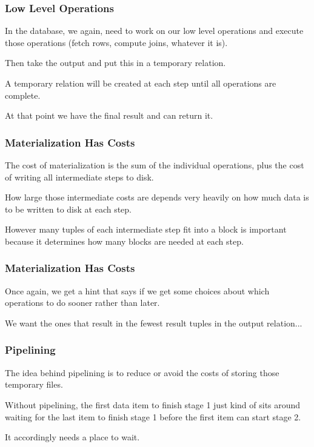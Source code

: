 \begin{frame}
\frametitle{Low Level Operations}
In the database, we again, need to work on our low level operations and execute those operations (fetch rows, compute joins, whatever it is).

Then take the output and put this in a temporary relation. 

A temporary relation will be created at each step until all operations are complete. 

At that point we have the final result and can return it. 


\end{frame}

\begin{frame}
\frametitle{Materialization Has Costs}
The cost of materialization is the sum of the individual operations, plus the cost of writing all intermediate steps to disk. 

How large those intermediate costs are depends very heavily on how much data is to be written to disk at each step. 

However many tuples of each intermediate step fit into a block is important because it determines how many blocks are needed at each step. 
\end{frame}

\begin{frame}
\frametitle{Materialization Has Costs}


Once again, we get a hint that says if we get some choices about which operations to do sooner rather than later.

We want the ones that result in the fewest result tuples in the output relation...


\end{frame}

\begin{frame}
\frametitle{Pipelining}

The idea behind pipelining is to reduce or avoid the costs of storing those temporary files. 

Without pipelining, the first data item to finish stage 1 just kind of sits around waiting for the last item to finish stage 1 before the first item can start stage 2. 

It accordingly needs a place to wait. 

\end{frame}

